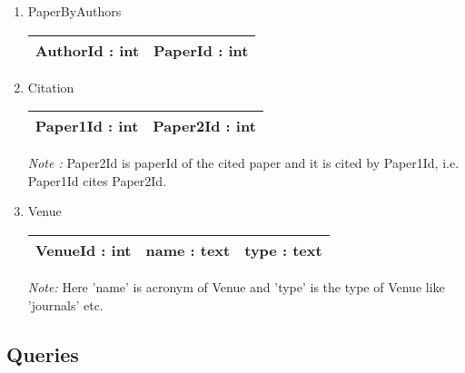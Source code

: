 \documentclass[10pt]{article}
\begin{document}
\begin{enumerate}
\begin{enumerate}
\item PaperByAuthors\\
        \begin{tabular}{|c|c|}
            \hline 
             AuthorId : int & PaperId : int \\
            \hline
        \end{tabular}
\item Citation\\
        \begin{tabular}{|c|c|}
            \hline 
             Paper1Id : int & Paper2Id : int \\
            \hline
        \end{tabular}

\emph{Note :} Paper2Id is paperId of the cited paper and it is cited by Paper1Id, i.e. Paper1Id cites Paper2Id.

\item Venue\\
        \begin{tabular}{|c|c|c|}
            \hline 
             VenueId : int & name : text & type : text\\
            \hline
        \end{tabular}

\emph{Note:} Here 'name' is acronym of Venue and 'type' is the type of Venue like 'journals' etc. 
\end{enumerate}

\end{enumerate}

\subsection{Queries}
\end{document}

